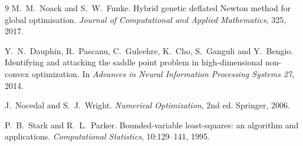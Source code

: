 \documentclass[11pt]{article}
\begin{document}
\begin{thebibliography}{9}
M.~M.~Noack and S.~W.~Funke.
\newblock Hybrid genetic deflated Newton method for global optimisation.
\newblock \emph{Journal of Computational and Applied Mathematics}, 325, 2017.

Y.~N.~Dauphin, R.~Pascanu, C.~Gulcehre, K.~Cho, S.~Ganguli and Y.~Bengio.
\newblock Identifying and attacking the saddle point problem in high-dimensional non-convex
optimization.
\newblock In \emph{Advances in Neural Information Processing Systems 27}, 2014.

J.~Nocedal and S.~J.~Wright.
\newblock \emph{Numerical Optimization}, 2nd ed.
\newblock Springer, 2006.

P.~B.~Stark and R.~L.~Parker.
\newblock Bounded-variable least-squares: an algorithm and applications.
\newblock \emph{Computational Statistics}, 10:129--141, 1995.
\end{thebibliography}
\end{document}
